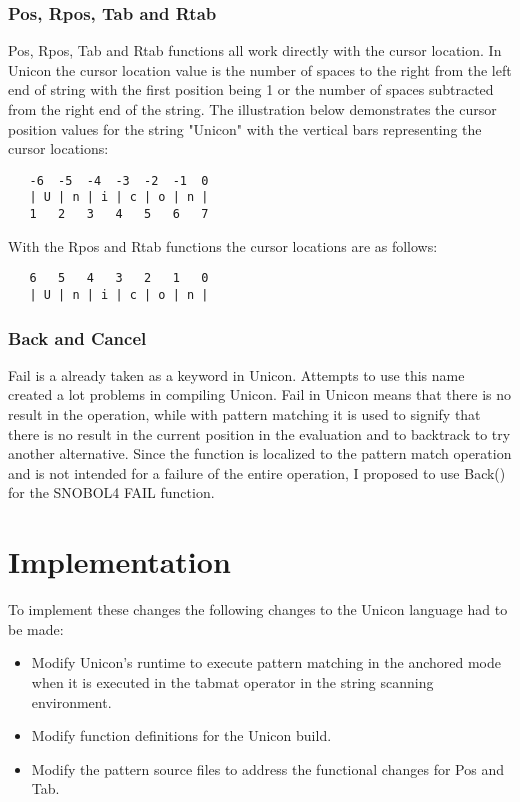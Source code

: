 \documentclass{article}
\begin{document}
\pagebreak
\vspace{2 pc}
\subsubsection{Pos, Rpos, Tab and Rtab}
Pos, Rpos, Tab and Rtab functions all work directly with the cursor location.  In Unicon the cursor location value is the number of spaces to the right from the left end of string with the first position being 1 or the number of spaces subtracted from the right end of the string.   The illustration below demonstrates the cursor position values for the string "Unicon" with the vertical bars representing the cursor locations:

\begin{verbatim}
   -6  -5  -4  -3  -2  -1  0
   | U | n | i | c | o | n |
   1   2   3   4   5   6   7
\end{verbatim}

With the Rpos and Rtab functions the cursor locations are as follows:

\begin{verbatim}
   6   5   4   3   2   1   0
   | U | n | i | c | o | n |
\end{verbatim}

\vspace{2 pc}
\subsubsection{Back and Cancel}
Fail is a already taken as a keyword in Unicon.  Attempts to use this name created a lot problems in compiling Unicon.  Fail in Unicon means that there is no result in the operation, while with pattern matching it is used to signify that there is no result in the current position in the evaluation and to backtrack to try another alternative.  Since the function is localized to the pattern match operation and is not intended for a failure of the entire operation, I proposed to use Back() for the SNOBOL4 FAIL function.

\section{Implementation}
To implement these changes the following changes to the Unicon language had to be made:
\begin{itemize}
\item Modify Unicon's runtime to execute pattern matching in the anchored mode when it is executed in the tabmat operator in the string scanning environment.
\item Modify function definitions for the Unicon build.
\item Modify the pattern source files to address the functional changes for Pos and Tab.
\end{itemize}
\end{document}
